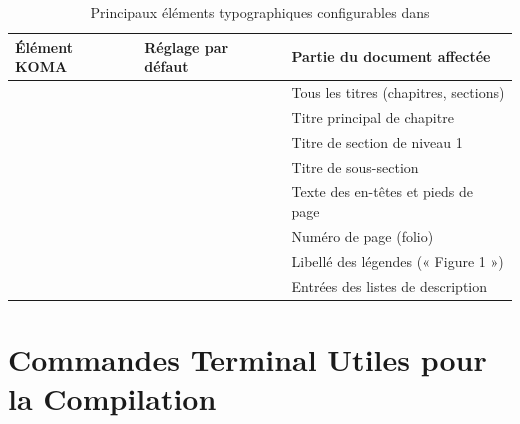 \begin{table}[htbp]
  \centering
  \footnotesize
  \caption{Principaux éléments typographiques configurables dans }
  \label{tab:koma-elements}
  \begin{tabularx}{\textwidth}{@{} l L{6.2cm} Y @{}}
    \toprule
    \textbf{Élément KOMA} & \textbf{Réglage par défaut} & \textbf{Partie du document affectée} \\
    \midrule
          &  & Tous les titres (chapitres, sections) \\
              &                    & Titre principal de chapitre \\
              &                   & Titre de section de niveau 1 \\
           &  & Titre de sous-section \\
         &  & Texte des en-têtes et pieds de page \\
           &            & Numéro de page (folio) \\
         &  & Libellé des légendes (« Figure 1 ») \\
     &  & Entrées des listes de description \\
    \bottomrule
  \end{tabularx}
\end{table}

\clearpage

\section{Commandes Terminal Utiles pour la Compilation}
\label{sec:commandes-terminal}

